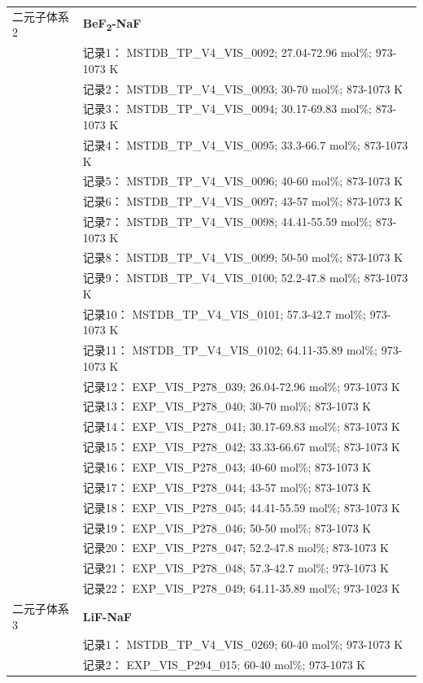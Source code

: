\documentclass[12pt]{article}
\begin{document}
{\begin{longtable}[]{@{}
  >{\raggedright\arraybackslash}p{}
  >{\raggedright\arraybackslash}p{}@{}}
二元子体系 2  & \textbf{BeF\textsubscript{2}-NaF} \\
 & 记录1： MSTDB\_TP\_V4\_VIS\_0092; 27.04-72.96 mol\%; 973-1073 K \\
 & 记录2： MSTDB\_TP\_V4\_VIS\_0093; 30-70 mol\%; 873-1073 K \\
 & 记录3： MSTDB\_TP\_V4\_VIS\_0094; 30.17-69.83 mol\%; 873-1073 K \\
 & 记录4： MSTDB\_TP\_V4\_VIS\_0095; 33.3-66.7 mol\%; 873-1073 K \\
 & 记录5： MSTDB\_TP\_V4\_VIS\_0096; 40-60 mol\%; 873-1073 K \\
 & 记录6： MSTDB\_TP\_V4\_VIS\_0097; 43-57 mol\%; 873-1073 K \\
 & 记录7： MSTDB\_TP\_V4\_VIS\_0098; 44.41-55.59 mol\%; 873-1073 K \\
 & 记录8： MSTDB\_TP\_V4\_VIS\_0099; 50-50 mol\%; 873-1073 K \\
 & 记录9： MSTDB\_TP\_V4\_VIS\_0100; 52.2-47.8 mol\%; 873-1073 K \\
 & 记录10： MSTDB\_TP\_V4\_VIS\_0101; 57.3-42.7 mol\%; 973-1073 K \\
 & 记录11： MSTDB\_TP\_V4\_VIS\_0102; 64.11-35.89 mol\%; 973-1073 K \\
 & 记录12： EXP\_VIS\_P278\_039; 26.04-72.96 mol\%; 973-1073 K \\
 & 记录13： EXP\_VIS\_P278\_040; 30-70 mol\%; 873-1073 K \\
 & 记录14： EXP\_VIS\_P278\_041; 30.17-69.83 mol\%; 873-1073 K \\
 & 记录15： EXP\_VIS\_P278\_042; 33.33-66.67 mol\%; 873-1073 K \\
 & 记录16： EXP\_VIS\_P278\_043; 40-60 mol\%; 873-1073 K \\
 & 记录17： EXP\_VIS\_P278\_044; 43-57 mol\%; 873-1073 K \\
 & 记录18： EXP\_VIS\_P278\_045; 44.41-55.59 mol\%; 873-1073 K \\
 & 记录19： EXP\_VIS\_P278\_046; 50-50 mol\%; 873-1073 K \\
 & 记录20： EXP\_VIS\_P278\_047; 52.2-47.8 mol\%; 873-1073 K \\
 & 记录21： EXP\_VIS\_P278\_048; 57.3-42.7 mol\%; 973-1073 K \\
 & 记录22： EXP\_VIS\_P278\_049; 64.11-35.89 mol\%; 973-1023 K  \\

二元子体系 3  & \textbf{LiF-NaF} \\
 & 记录1： MSTDB\_TP\_V4\_VIS\_0269; 60-40 mol\%; 973-1073 K \\
 & 记录2： EXP\_VIS\_P294\_015; 60-40 mol\%; 973-1073 K  \\


\end{longtable}}
\end{document}
